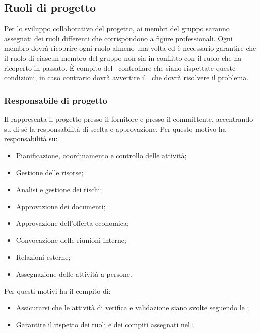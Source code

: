 \documentclass[../NormeProgetto.tex]{subfiles}
\begin{document}
	\subsection{Ruoli di progetto}
	Per lo sviluppo collaborativo del progetto, ai membri del gruppo saranno assegnati dei ruoli differenti che corrispondono a figure professionali. Ogni membro dovrà ricoprire ogni ruolo almeno una volta ed è necessario garantire che il ruolo di ciascun membro del gruppo non sia in conflitto con il ruolo che ha ricoperto in passato. È compito del \verificatore\ controllare che siano rispettate queste condizioni, in caso contrario dovrà avvertire il \responsabilediprogetto\ che dovrà risolvere il problema.
		\subsubsection{Responsabile di progetto}
		Il \responsabilediprogetto rappresenta il progetto presso il fornitore e presso il committente, accentrando su di sé la responsabilità di scelta e approvazione. Per questo motivo ha responsabilità su:
		\begin{itemize}
		\item Pianificazione, coordinamento e controllo delle attività;
		\item Gestione delle risorse;
		\item Analisi e gestione dei rischi;
		\item Approvazione dei documenti;
		\item Approvazione dell'offerta economica;
		\item Convocazione delle riunioni interne;
		\item Relazioni esterne;
		\item Assegnazione delle attività a persone.
		\end{itemize}
		Per questi motivi ha il compito di:
		\begin{itemize}
		\item Assicurarsi che le attività di verifica e validazione siano svolte seguendo le \normediprogetto;
		\item Garantire il rispetto dei ruoli e dei compiti assegnati nel \pianodiprogetto;
		\end{itemize}
\end{document}
